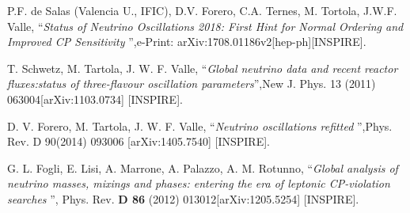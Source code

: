 \documentclass[a4paper,11pt]{article}
\begin{document}
\begin{thebibliography}{99}
P.F. de Salas (Valencia U., IFIC), D.V. Forero, C.A. Ternes,
M. Tortola, J.W.F. Valle, ``{\em Status of Neutrino Oscillations 2018: First Hint for Normal Ordering and Improved CP Sensitivity }'',e-Print: arXiv:1708.01186v2[hep-ph][INSPIRE]. 


 T. Schwetz, M. Tartola, J. W. F. Valle, ``{\em Global neutrino data and recent reactor fluxes:status of three-flavour oscillation parameters}'',New J. Phys. 13 (2011) 063004[arXiv:1103.0734] [INSPIRE].

 D. V. Forero, M. Tartola, J. W. F. Valle, ``{\em Neutrino oscillations refitted }'',Phys. Rev. D 90(2014) 093006 [arXiv:1405.7540] [INSPIRE].

  G. L. Fogli, E. Lisi, A. Marrone, A. Palazzo, A. M. Rotunno, ``{\em Global analysis of neutrino masses, mixings and phases: entering the era of leptonic CP-violation searches }'', Phys. Rev. {\bf D 86} (2012) 013012[arXiv:1205.5254] [INSPIRE].


\end{thebibliography}
\end{document}
